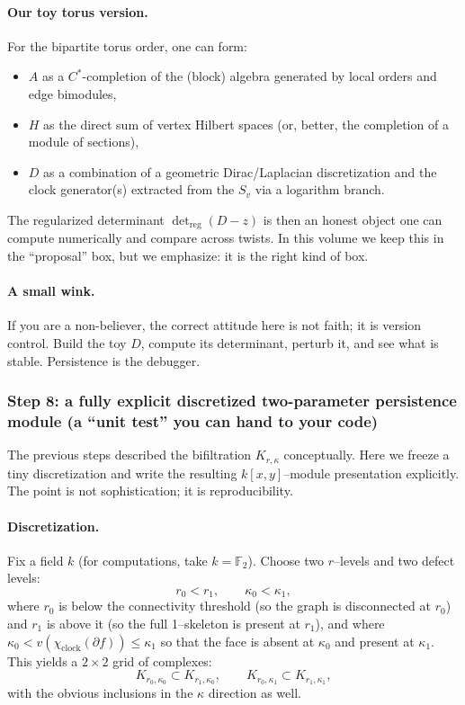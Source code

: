 \documentclass[11pt,oneside]{amsbook}
\numberwithin{equation}{section}
\theoremstyle{plain}
\theoremstyle{definition}
\theoremstyle{remark}
\newcommand{\F}{\mathbb{F}}
\begin{document}
\paragraph{Our toy torus version.}
For the bipartite torus order, one can form:
\begin{itemize}
\item $A$ as a $C^\ast$-completion of the (block) algebra generated by local orders and edge bimodules,
\item $H$ as the direct sum of vertex Hilbert spaces (or, better, the completion of a module of sections),
\item $D$ as a combination of a geometric Dirac/Laplacian discretization and the clock generator(s) extracted from the $S_v$ via a logarithm branch.
\end{itemize}
The regularized determinant $\det_{\mathrm{reg}}(D-z)$ is then an honest object one can compute numerically and compare across twists.
In this volume we keep this in the ``proposal'' box, but we emphasize: it is the right kind of box.

\paragraph{A small wink.}
If you are a non-believer, the correct attitude here is not faith; it is version control.
Build the toy $D$, compute its determinant, perturb it, and see what is stable.
Persistence is the debugger.

\subsubsection{Step 8: a fully explicit discretized two-parameter persistence module (a ``unit test'' you can hand to your code)}
\label{sec:bipartite_step8_persistence}

The previous steps described the bifiltration $K_{r,\kappa}$ conceptually.
Here we freeze a tiny discretization and write the resulting $k[x,y]$--module presentation explicitly.
The point is not sophistication; it is reproducibility.

\paragraph{Discretization.}
Fix a field $k$ (for computations, take $k=\F_2$).
Choose two $r$--levels and two defect levels:
\[
r_0<r_1,\qquad \kappa_0<\kappa_1,
\]
where $r_0$ is below the connectivity threshold (so the graph is disconnected at $r_0$) and $r_1$ is above it (so the full 1--skeleton is present at $r_1$),
and where $\kappa_0< v(\chi_{\mathrm{clock}}(\partial f))\le \kappa_1$ so that the face is absent at $\kappa_0$ and present at $\kappa_1$.
This yields a $2\times 2$ grid of complexes:
\[
K_{r_0,\kappa_0}\subset K_{r_1,\kappa_0},\qquad
K_{r_0,\kappa_1}\subset K_{r_1,\kappa_1},
\]
with the obvious inclusions in the $\kappa$ direction as well.
\end{document}
